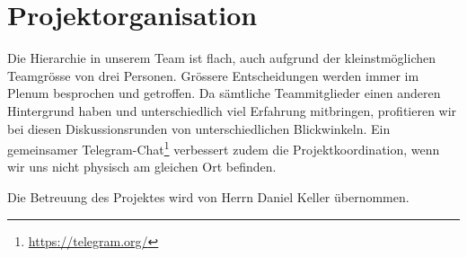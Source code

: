 \documentclass[a4paper]{article}
\let\oldsection\section
\renewcommand\section{\clearpage\oldsection}
\begin{document}
\section{Projektorganisation}
Die Hierarchie in unserem Team ist flach, auch aufgrund der kleinstmöglichen Teamgrösse von drei Personen. Grössere Entscheidungen werden immer im Plenum besprochen und getroffen. Da sämtliche Teammitglieder einen anderen Hintergrund haben und unterschiedlich viel Erfahrung mitbringen, profitieren wir bei diesen Diskussionsrunden von unterschiedlichen Blickwinkeln. Ein gemeinsamer Telegram-Chat\footnote{\url{https://telegram.org/}} verbessert zudem die Projektkoordination, wenn wir uns nicht physisch am gleichen Ort befinden.


Die Betreuung des Projektes wird von Herrn Daniel Keller übernommen.
\end{document}
